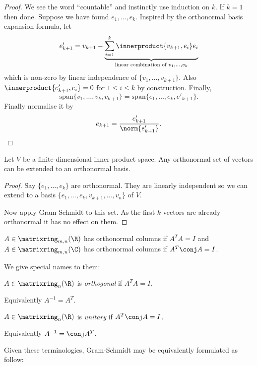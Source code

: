 \documentclass[a4paper]{article}
\newcommand*{\M}{\matrixring}
\newcommand*{\ip}{\innerproduct}
\theoremstyle{definition}
\begin{document}
\begin{proof}
  We see the word ``countable'' and instinctly use induction on \(k\). If \(k = 1\) then done. Suppose we have found \(e_1, \dots, e_k\). Inspired by the orthonormal basis expansion formula, let
  \[
    e'_{k + 1} = v_{k + 1} - \underbrace{\sum_{i = 1}^k \ip{v_{k + 1}, e_i} e_i}_{\text{linear combination of } v_1, \dots, v_k}
  \]
  which is non-zero by linear independence of \(\{v_1, \dots, v_{k + 1}\}\). Also \(\ip{e'_{k + 1}, e_i} = 0\) for \(1 \leq i \leq k\) by construction. Finally,
\[
  \text{span} \{v_1, \dots, v_k, v_{k + 1}\} = \text{span} \{e_1, \dots, e_k, e'_{k + 1}\}.
\]
Finally normalise it by
\[
  e_{k + 1} = \frac{e'_{k + 1}}{\norm{e'_{k + 1}}}.
\]
\end{proof}

\begin{corollary}
  Let \(V\) be a finite-dimensional inner product space. Any orthonormal set of vectors can be extended to an orthonormal basis.
\end{corollary}

\begin{proof}
  Say \(\{e_1, \dots, e_k\}\) are orthonormal. They are linearly independent so we can extend to a basis \(\{e_1, \dots, e_k, v_{k + 1}, \dots, v_n\}\) of \(V\).

  Now apply Gram-Schmidt to this set. As the first \(k\) vectors are already orthonormal it has no effect on them.
\end{proof}

\begin{note}
  \(A \in \M_{m, n}(\R)\) has orthonormal columns if \(A^TA = I\) and \(A \in \M_{m, n}(\C)\) has orthonormal columns if \(A^T \conj A = I\).
\end{note}

We give special names to them:

\begin{definition}
  \(A \in \M_n(\R)\) is \emph{orthogonal} if \(A^T A = I\).
\end{definition}

Equivalently \(A^{-1} = A^T\).

\begin{definition}
  \(A \in \M_n(\R)\) is \emph{unitary} if \(A^T \conj A = I\).
\end{definition}

Equivalently \(A^{-1} = \conj A^T\).

Given these terminologies, Gram-Schmidt may be equivalently formulated as follow:
\end{document}
